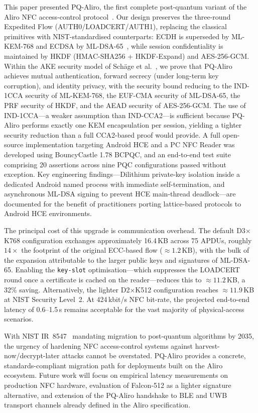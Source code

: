 \documentclass[runningheads]{llncs}
\begin{document}
This paper presented PQ-Aliro, the first complete post-quantum variant of the Aliro NFC
access-control protocol~\cite{CSA:Aliro10}.
Our design preserves the three-round Expedited Flow (AUTH0/LOADCERT/AUTH1), replacing
the classical primitives with NIST-standardised counterparts: ECDH is superseded by
ML-KEM-768 and ECDSA by ML-DSA-65~\cite{NIST:FIPS203,NIST:FIPS204},
while session confidentiality is maintained by HKDF (HMAC-SHA256 + HKDF-Expand) and
AES-256-GCM.
Within the AKE security model of Sch{\"a}ge et al.~\cite{PKC:SchSchLau20}, we prove that PQ-Aliro achieves mutual authentication, forward secrecy (under long-term key corruption), and identity privacy, with the security bound reducing to the IND-1CCA security of ML-KEM-768, the EUF-CMA security of ML-DSA-65, the PRF security of HKDF, and the AEAD security of AES-256-GCM. The use of IND-1CCA---a weaker assumption than IND-CCA2---is sufficient because PQ-Aliro performs exactly one KEM encapsulation per session, yielding a tighter security reduction than a full CCA2-based proof would provide.
A full open-source implementation targeting Android HCE and a PC NFC Reader was
developed using BouncyCastle 1.78 BCPQC, and an end-to-end test suite comprising
20 assertions across nine PQC configurations passed without exception.
Key engineering findings---Dilithium private-key isolation inside a dedicated Android named process with immediate self-termination, and asynchronous ML-DSA signing to prevent HCE main-thread deadlock---are documented for the benefit of practitioners porting lattice-based protocols to Android HCE environments.

The principal cost of this upgrade is communication overhead.
The default D3$\times$K768 configuration exchanges approximately 16.4\,KB across
75 APDUs, roughly $14\times$ the footprint of the original ECC-based flow
(${\approx}1.2$\,KB), with the bulk of the expansion attributable to the larger public
keys and signatures of ML-DSA-65.
Enabling the \texttt{key-slot} optimisation---which suppresses the LOADCERT round once
a certificate is cached on the reader---reduces this to ${\approx}11.2$\,KB, a 32\%
saving.
Alternatively, the lighter D2$\times$K512 configuration reaches ${\approx}11.9$\,KB at
NIST Security Level~2.
At 424\,kbit/s NFC bit-rate, the projected end-to-end latency of 0.6--1.5\,s remains
acceptable for the vast majority of physical-access scenarios.

With NIST IR~8547~\cite{NIST:IR8547} mandating migration to post-quantum algorithms by
2035, the urgency of hardening NFC access-control systems against harvest-now/decrypt-later
attacks cannot be overstated.
PQ-Aliro provides a concrete, standards-compliant migration path for deployments built on
the Aliro~\cite{CSA:Aliro10} ecosystem.
Future work will focus on empirical latency measurements on production NFC hardware,
evaluation of Falcon-512 as a lighter signature alternative, and extension of the
PQ-Aliro handshake to BLE and UWB transport channels already defined in the Aliro
specification.




\end{document}
